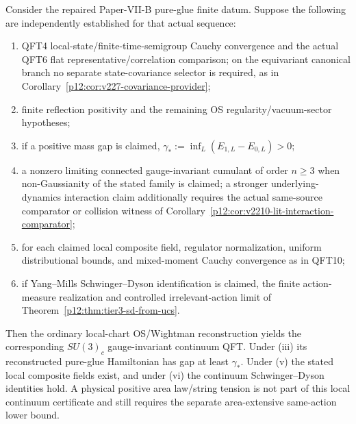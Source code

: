 \documentclass[12pt,a4paper]{article}
\begin{document}
\begin{theorem}
\label{p12:thm:native-bh-ym-continuum}
Consider the repaired Paper-VII-B pure-glue finite datum.  Suppose the following are independently established for that actual sequence:
\begin{enumerate}[label=\textnormal{(\roman*)}]
\item QFT4 local-state/finite-time-semigroup Cauchy convergence and the actual QFT6 flat representative/correlation comparison; on the equivariant canonical branch no separate state-covariance selector is required, as in Corollary~\ref{p12:cor:v227-covariance-provider};
\item finite reflection positivity and the remaining OS regularity/vacuum-sector hypotheses;
\item if a positive mass gap is claimed, \(\gamma_*:=\inf_L(E_{1,L}-E_{0,L})>0\);
\item a nonzero limiting connected gauge-invariant cumulant of order \(n\ge3\) when non-Gaussianity of the stated family is claimed; a stronger underlying-dynamics interaction claim additionally requires the actual same-source comparator or collision witness of Corollary~\ref{p12:cor:v2210-lit-interaction-comparator};
\item for each claimed local composite field, regulator normalization, uniform distributional bounds, and mixed-moment Cauchy convergence as in QFT10;
\item if Yang--Mills Schwinger--Dyson identification is claimed, the finite action-measure realization and controlled irrelevant-action limit of Theorem~\ref{p12:thm:tier3-sd-from-ucs}.
\end{enumerate}
Then the ordinary local-chart OS/Wightman reconstruction yields the corresponding \(SU(3)_c\) gauge-invariant continuum QFT.  Under (iii) its reconstructed pure-glue Hamiltonian has gap at least \(\gamma_*\).  Under (v) the stated local composite fields exist, and under (vi) the continuum Schwinger--Dyson identities hold.  A physical positive area law/string tension is not part of this local continuum certificate and still requires the separate area-extensive same-action lower bound.
\end{theorem}
\end{document}
